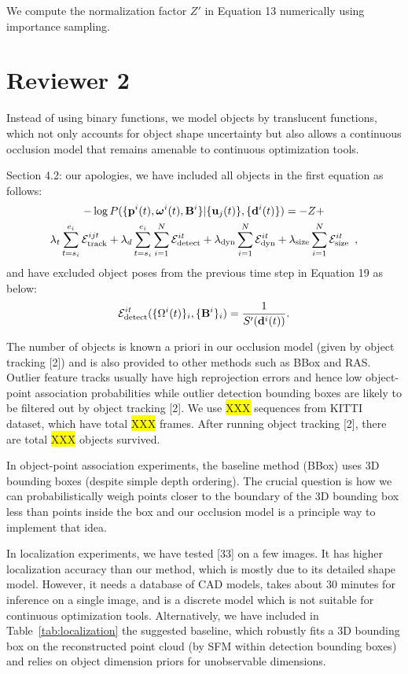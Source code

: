 \documentclass[10pt,twocolumn,letterpaper]{article}
\newcommand{\hili}[1]{\colorbox{yellow}{#1}}
\begin{document}
We compute the normalization factor $Z'$ in Equation 13 numerically using importance sampling.

\section{Reviewer 2}

Instead of using binary functions, we model objects by translucent functions, which not only accounts for object shape uncertainty but also allows a continuous occlusion model that remains amenable to continuous optimization tools. 

Section 4.2: our apologies, we have included all objects in the first equation as follows:
\begin{multline*}
  -\log{P(\{ \mathbf{p}^i(t) , \bm{\omega}^i(t) , \mathbf{B}^i \} | \{\mathbf{u}_j(t)\} , \{\mathbf{d}^{i}(t)\} )} = -Z + \\ 
  \lambda_t \sum_{t=s_i}^{e_i} \mathcal{E}^{ijt}_{\text{track}}
  + 
  \lambda_d \sum_{t=s_i}^{e_i} \sum_{i=1}^N \mathcal{E}^{it}_{\text{detect}}
  + 
  \lambda_{\text{dyn}} \sum_{i=1}^N \mathcal{E}^{it}_{\text{dyn}}
  + 
  \lambda_{\text{size}} \sum_{i=1}^N \mathcal{E}^{it}_{\text{size}}
  \enspace,
\end{multline*}
and have excluded object poses from the previous time step in Equation 19 as below:
\begin{align*}
\mathcal{E}^{it}_{\text{detect}}(\{ \Omega^{i}(t) \}_i, \{\mathbf{B}^{i}\}_i ) = \frac{1}{S'(\mathbf{d}^{i}(t))}.
\end{align*}

The number of objects is known a priori in our occlusion model (given by object tracking [2]) and is also provided to other methods such as BBox and RAS. Outlier feature tracks usually have high reprojection errors and hence low object-point association probabilities while outlier detection bounding boxes are likely to be filtered out by object tracking [2]. We use \hili{XXX} sequences from KITTI dataset, which have total \hili{XXX} frames. After running object tracking [2], there are total \hili{XXX} objects survived.

In object-point association experiments, the baseline method (BBox) uses 3D bounding boxes (despite simple depth ordering). The crucial question is how we can probabilistically weigh points closer to the boundary of the 3D bounding box less than points inside the box and our occlusion model is a principle way to implement that idea.

In localization experiments, we have tested [33] on a few images. It has higher localization accuracy than our method, which is mostly due to its detailed shape model. However, it needs a database of CAD models, takes about 30 minutes for inference on a single image, and is a discrete model which is not suitable for continuous optimization tools. Alternatively, we have included in Table~\ref{tab:localization} the suggested baseline, which robustly fits a 3D bounding box on the reconstructed point cloud (by SFM within detection bounding boxes) and relies on object dimension priors for unobservable dimensions.
\end{document}
